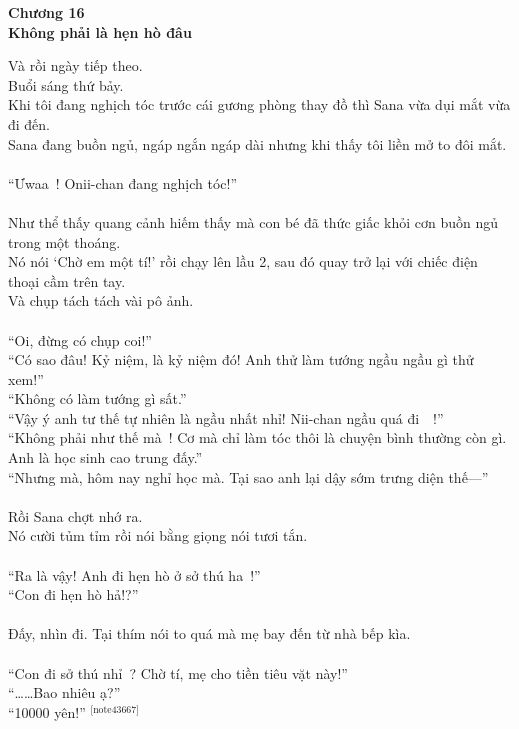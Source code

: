 \documentclass[12pt,a4paper, twosides]{book}
\begin{document}
    \begin{center}
    \textbf{\large Chương 16 \\ Không phải là hẹn hò đâu}
    \end{center}
    \noindent
Và rồi ngày tiếp theo.\\
Buổi sáng thứ bảy.\\
Khi tôi đang nghịch tóc trước cái gương phòng thay đồ thì Sana vừa dụi mắt vừa đi đến.\\
Sana đang buồn ngủ, ngáp ngắn ngáp dài nhưng khi thấy tôi liền mở to đôi mắt.\\
\\
“Ưwaa~! Onii-chan đang nghịch tóc!”\\
\\
Như thể thấy quang cảnh hiếm thấy mà con bé đã thức giấc khỏi cơn buồn ngủ trong một thoáng.\\
Nó nói ‘Chờ em một tí!’ rồi chạy lên lầu 2, sau đó quay trở lại với chiếc điện thoại cầm trên tay.\\
Và chụp tách tách vài pô ảnh.\\
\\
“Oi, đừng có chụp coi!”\\
“Có sao đâu! Kỷ niệm, là kỷ niệm đó! Anh thử làm tướng ngầu ngầu gì thử xem!”\\
“Không có làm tướng gì sất.”\\
“Vậy ý anh tư thế tự nhiên là ngầu nhất nhỉ! Nii-chan ngầu quá đi~~!”\\
“Không phải như thế mà~! Cơ mà chỉ làm tóc thôi là chuyện bình thường còn gì. Anh là học sinh cao trung đấy.”\\
“Nhưng mà, hôm nay nghỉ học mà. Tại sao anh lại dậy sớm trưng diện thế—”\\
\\
Rồi Sana chợt nhớ ra.\\
Nó cười tủm tỉm rồi nói bằng giọng nói tươi tắn.\\
\\
“Ra là vậy! Anh đi hẹn hò ở sở thú ha~!”\\
“Con đi hẹn hò hả!?”\\
\\
Đấy, nhìn đi. Tại thím nói to quá mà mẹ bay đến từ nhà bếp kìa.\\
\\
“Con đi sở thú nhỉ~? Chờ tí, mẹ cho tiền tiêu vặt này!”\\
“……Bao nhiêu ạ?”\\
“10000 yên!” $^\text{[note43667]}$\\
\end{document}
